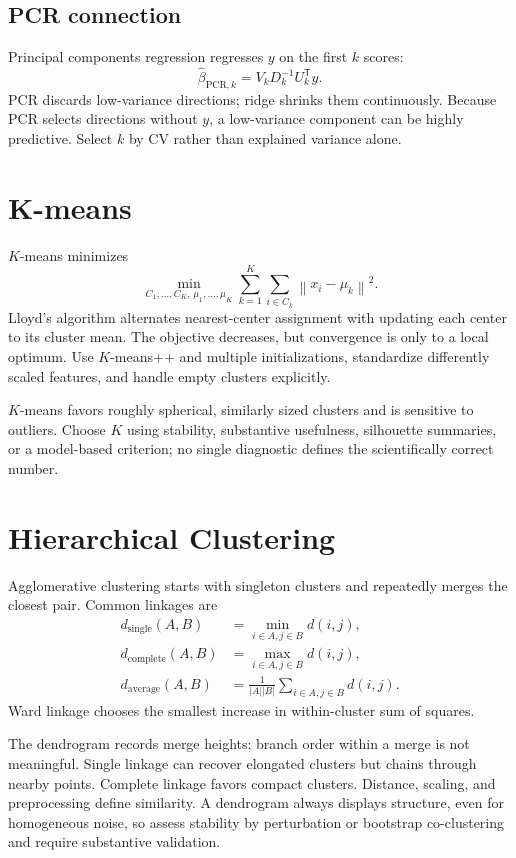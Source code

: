 \documentclass[12pt,oneside]{book}
\numberwithin{equation}{section}
\theoremstyle{definition}
\theoremstyle{plain}
\theoremstyle{remark}
\newcommand{\norm}[1]{\left\lVert #1 \right\rVert}
\newcommand{\abs}[1]{\left\lvert #1 \right\rvert}
\begin{document}
\subsection{PCR connection}

Principal components regression regresses $y$ on the first $k$ scores:
\[
 \widehat\beta_{\mathrm{PCR},k}=V_kD_k^{-1}U_k^\mathsf Ty.
\]
PCR discards low-variance directions; ridge shrinks them continuously. Because
PCR selects directions without $y$, a low-variance component can be highly
predictive. Select $k$ by CV rather than explained variance alone.

\section{K-means}

$K$-means minimizes
\begin{equation}
 \min_{C_1,\ldots,C_K,\,\mu_1,\ldots,\mu_K}
 \sum_{k=1}^K\sum_{i\in C_k}\norm{x_i-\mu_k}^2.
 \label{eq:kmeans-objective}
\end{equation}
Lloyd's algorithm alternates nearest-center assignment with updating each
center to its cluster mean. The objective decreases, but convergence is only
to a local optimum. Use $K$-means++ and multiple initializations, standardize
differently scaled features, and handle empty clusters explicitly.

$K$-means favors roughly spherical, similarly sized clusters and is sensitive
to outliers. Choose $K$ using stability, substantive usefulness, silhouette
summaries, or a model-based criterion; no single diagnostic defines the
scientifically correct number.

\section{Hierarchical Clustering}

Agglomerative clustering starts with singleton clusters and repeatedly merges
the closest pair. Common linkages are
\begin{align*}
 d_{\mathrm{single}}(A,B)&=\min_{i\in A,j\in B}d(i,j),\\
 d_{\mathrm{complete}}(A,B)&=\max_{i\in A,j\in B}d(i,j),\\
 d_{\mathrm{average}}(A,B)&=\frac1{\abs A\abs B}
     \sum_{i\in A,j\in B}d(i,j).
\end{align*}
Ward linkage chooses the smallest increase in within-cluster sum of squares.

The dendrogram records merge heights; branch order within a merge is not
meaningful. Single linkage can recover elongated clusters but chains through
nearby points. Complete linkage favors compact clusters. Distance, scaling,
and preprocessing define similarity. A dendrogram always displays structure,
even for homogeneous noise, so assess stability by perturbation or bootstrap
co-clustering and require substantive validation.
\end{document}
